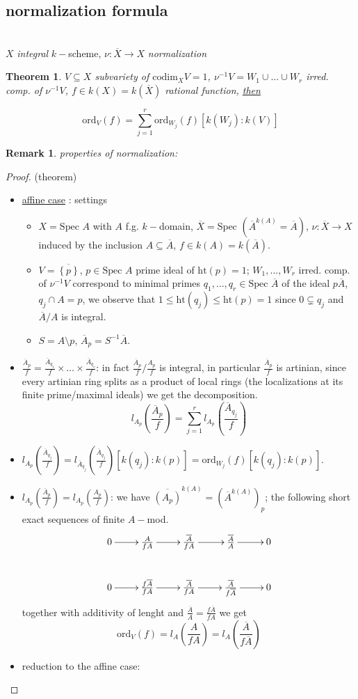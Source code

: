 \documentclass[oneside,a4paper,11pt]{amsbook}
\theoremstyle{pl}
\newtheorem*{teo*}{Theorem}
\theoremstyle{df}
\theoremstyle{rm}
\newtheorem{rmk}{Remark}[chapter]
\newcommand{\nline}{
~\\
}%
\newcommand{\pa}[1]{
\left(#1\right)
}
\newcommand{\qa}[1]{
\left[#1\right]
}
\newcommand{\ga}[1]{
\left\{#1\right\}
}
\newcommand{\ol}[1]{
\overline{#1}
}
\newcommand{\ul}[1]{
\underline{#1}
}
\newcommand{\spc}[1]{
\text{Spec }#1
}
\newcommand{\ord}[2]{
\text{ord}_{#1}\pa{#2}
}
\newcommand{\cod}[2]{
\text{codim}_{#1}{#2}
}
\begin{document}
\subsection{normalization formula}
\nline
$X$ \emph{integral} $k-$scheme, $\nu:\ol{X}\rightarrow X$ \emph{normalization}

\begin{teo*}
$V\subseteq X$ subvariety of $\cod{X}{V}=1$, $\nu^{-1}V=W_1\cup\dots\cup W_r$ irred. comp. of $\nu^{-1}V$, $f\in k(X)=k(\ol{X})$ rational function, \ul{then}
\[
\ord{V}{f}=\sum_{j=1}^r{\ord{W_j}{f}\qa{k(W_j):k(V)}}
\]
\end{teo*}

\begin{rmk}
properties of normalization:
\end{rmk}

\begin{proof}(theorem)
\begin{itemize}
\item{\ul{affine case}: settings
\begin{itemize}
\item{$X=\spc A$ with $A$ f.g. $k-$domain, $\ol{X}=\spc\pa{\ol{A}^{k(A)}=\ol{A}}$, $\nu:\ol{X}\rightarrow X$ induced by the inclusion $A\subseteq\ol{A}$, $f\in k(A)=k(\ol{A})$.}
\item{$V=\ol{\ga{p}}$, $p\in\spc A$ prime ideal of $\text{ht}(p)=1$; $W_1,\dots,W_r$ irred. comp. of $\nu^{-1}V$ correspond to minimal primes $q_1,\dots,q_r\in\spc\ol{A}$ of the ideal $p\ol{A}$, $q_j\cap A=p$, we observe that $1\le\text{ht}(q_j)\le\text{ht}(p)=1$ since $0\subsetneq q_j$ and $\ol{A}/A$ is integral.}
\item{$S=A\setminus p$, $\ol{A}_p=S^{-1}\ol{A}$.}
\end{itemize}
}
\item{$\frac{\ol{A}_p}{f}=\frac{\ol{A}_{q_1}}{f}\times\dots\times\frac{\ol{A}_{q_r}}{f}$: in fact $\frac{\ol{A}_p}{f}/\frac{A_p}{f}$ is integral, in particular $\frac{\ol{A}_p}{f}$ is artinian, since every artinian ring splits as a product of local rings (the localizations at its finite prime/maximal ideals) we get the decomposition.
\[
l_{A_p}\pa{\frac{\ol{A}_p}{f}}=\sum_{j=1}^r{l_{A_p}\pa{\frac{\ol{A}_{q_j}}{f}}}
\]
}
\item{$l_{A_p}\pa{\frac{\ol{A}_{q_j}}{f}}=l_{\ol{A}_{q_j}}\pa{\frac{\ol{A}_{q_j}}{f}}[k(q_j):k(p)]=\ord{W_j}{f} [k(q_j):k(p)]$.}
\item{$l_{A_p}\pa{\frac{\ol{A}_p}{f}}=l_{A_p}\pa{\frac{A_p}{f}}$: we have $\ol{\pa{A_p}}^{k(A)}=\pa{\ol{A}^{k(A)}}_p$; the following short exact sequences of finite $A-$mod.
\[
\xymatrix{
0\ar[r] &\frac{A}{fA}\ar[r] &\frac{\ol{A}}{fA}\ar[r] &\frac{\ol{A}}{A}\ar[r] &0\\
0\ar[r] &\frac{f\ol{A}}{fA}\ar[r] &\frac{\ol{A}}{fA}\ar[r] &\frac{\ol{A}}{f\ol{A}}\ar[r] &0\\
}
\]
together with additivity of lenght and $\frac{\ol{A}}{A}=\frac{f\ol{A}}{fA}$ we get 
\[
\ord{V}{f}=l_A\pa{\frac{A}{fA}}=l_A\pa{\frac{\ol{A}}{f\ol{A}}}
\]
}
\item{reduction to the affine case:}
\end{itemize}
\end{proof}
\end{document}
